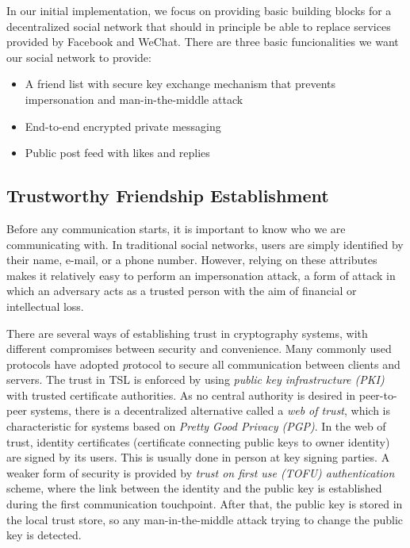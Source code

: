 In our initial implementation, we focus on providing basic building blocks for a decentralized social network that should in principle be able to replace services provided by Facebook and WeChat. There are three basic funcionalities we want our social network to provide:

\begin{itemize}
    \item A friend list with secure key exchange mechanism that prevents impersonation and man-in-the-middle attack
    \item End-to-end encrypted private messaging
    \item Public post feed with likes and replies
\end{itemize}

\subsection{Trustworthy Friendship Establishment}

Before any communication starts, it is important to know who we are communicating with. In traditional social networks, users are simply identified by their name, e-mail, or a phone number. However, relying on these attributes makes it relatively easy to perform an impersonation attack, a form of attack in which an adversary acts as a trusted person with the aim of financial or intellectual loss.

There are several ways of establishing trust in cryptography systems, with different compromises between security and convenience. Many commonly used protocols have adopted \textit protocol to secure all communication between clients and servers. The trust in TSL is enforced by using \textit{public key infrastructure (PKI)} with trusted certificate authorities. As no central authority is desired in peer-to-peer systems, there is a decentralized alternative called a \textit{web of trust}, which is characteristic for systems based on \textit{Pretty Good Privacy (PGP)}. In the web of trust, identity certificates (certificate connecting public keys to owner identity) are signed by its users. This is usually done in person at key signing parties. A weaker form of security is provided by \textit{trust on first use (TOFU) authentication} scheme, where the link between the identity and the public key is established during the first communication touchpoint. After that, the public key is stored in the local trust store, so any man-in-the-middle attack trying to change the public key is detected.

